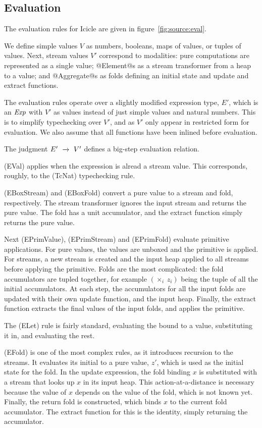 \subsection{Evaluation}

The evaluation rules for Icicle are given in figure~\ref{fig:source:eval}.

We define simple values $V$ as numbers, booleans, maps of values, or tuples of values.
Next, stream values $V'$ correspond to modalities: pure computations are represented as a single value;
@Element@s as a stream transformer from a heap to a value;
and @Aggregate@s as folds defining an initial state and update and extract functions.

The evaluation rules operate over a slightly modified expression type, $E'$, which is an $\mathit{Exp}$ with $V'$ as values instead of just simple values and natural numbers.
This is to simplify typechecking over $V'$, and as $V'$ only appear in restricted form for evaluation.
We also assume that all functions have been inlined before evaluation.

The judgment $E' ~\xrightarrow~~ V'$ defines a big-step evaluation relation.

(EVal) applies when the expression is alread a stream value.
This corresponds, roughly, to the (TcNat) typechecking rule.

(EBoxStream) and (EBoxFold) convert a pure value to a stream and fold, respectively.
The stream transformer ignores the input stream and returns the pure value.
The fold has a unit accumulator, and the extract function simply returns the pure value.

Next (EPrimValue), (EPrimStream) and (EPrimFold) evaluate primitive applications.
For pure values, the values are unboxed and the primitive is applied.
For streams, a new stream is created and the input heap applied to all streams before applying the primitive.
Folds are the most complicated: the fold accumulators are tupled together, for example $(\times_i~z_i)$ being the tuple of all the initial accumulators.
At each step, the accumulators for all the input folds are updated with their own update function, and the input heap.
Finally, the extract function extracts the final values of the input folds, and applies the primitive.

The (ELet) rule is fairly standard, evaluating the bound to a value, substituting it in, and evaluating the rest.

(EFold) is one of the most complex rules, as it introduces recursion to the streams.
It evaluates its initial to a pure value, $z'$, which is used as the initial state for the fold.
In the update expression, the fold binding $x$ is substituted with a stream that looks up $x$ in its input heap.
This action-at-a-distance is necessary because the value of $x$ depends on the value of the fold, which is not known yet.
Finally, the return fold is constructed, which binds $x$ to the current fold accumulator.
The extract function for this is the identity, simply returning the accumulator.


